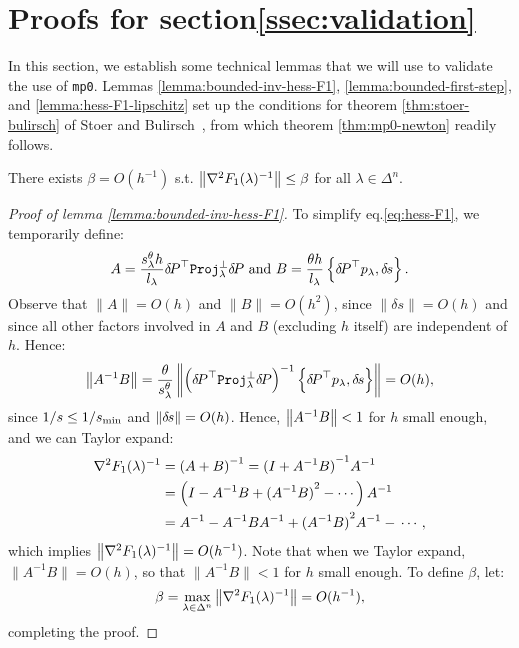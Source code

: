 \documentclass[smallcondensed]{svjour3}
\begin{document}
\section{Proofs for
  section\@ \ref{ssec:validation}}\label{app:validation-proofs} In this section, we establish some technical lemmas that we will use
to validate the use of \texttt{mp0}. Lemmas
\ref{lemma:bounded-inv-hess-F1}, \ref{lemma:bounded-first-step}, and
\ref{lemma:hess-F1-lipschitz} set up the conditions for theorem
\ref{thm:stoer-bulirsch} of Stoer and
Bulirsch~\cite{stoer2013introduction}, from which theorem
\ref{thm:mp0-newton} readily follows.

\begin{lemma}\label{lemma:bounded-inv-hess-F1}
  There exists $\beta = O(h^{-1})$ s.t.
  $\left\|\nabla^2 F_1(\lambda)^{-1}\right\| \leq \beta$ for all
  $\lambda \in \Delta^n$.
\end{lemma}

\begin{proof}[Proof of lemma \ref{lemma:bounded-inv-hess-F1}]
  To simplify eq.\@ \ref{eq:hess-F1}, we temporarily define:
  \begin{equation}
    A = \frac{s^\theta_\lambda h}{l_\lambda} {\delta \hspace{-0.14em} P}^\top \mathtt{Proj}^\perp_\lambda {\delta \hspace{-0.14em} P} \mbox{ and } B = \frac{\theta h}{l_\lambda} \left\{{\delta \hspace{-0.14em} P}^\top p_\lambda, {\delta \hspace{-0.1em} s}\right\}.
  \end{equation}
  Observe that $\|A\| = O(h)$ and $\|B\| = O(h^2)$, since
  $\|\delta s\| = O(h)$ and since all other factors involved in $A$
  and $B$ (excluding $h$ itself) are independent of $h$. Hence:
  \begin{equation}
    \left\|A^{-1} B\right\| = \frac{\theta}{s^\theta_\lambda} \left\|\left({\delta \hspace{-0.14em} P}^\top \mathtt{Proj}^\perp_\lambda {\delta \hspace{-0.14em} P}\right)^{-1} \left\{{\delta \hspace{-0.14em} P}^\top p_\lambda, {\delta \hspace{-0.1em} s}\right\}\right\| = O(h),
  \end{equation}
  since $1/s \leq 1/s_{\operatorname{min}}$ and $\left\|{\delta \hspace{-0.1em} s}\right\| = O(h)$. Hence,
  $\left\|A^{-1} B\right\| < 1$ for $h$ small enough, and we can Taylor
  expand:
  \begin{equation}
    \begin{aligned}
      \nabla^2 F_1(\lambda)^{-1} &= \left(A + B\right)^{-1} = {(I + A^{-1} B)}^{-1} A^{-1} \\
      &= \left(I - A^{-1} B + {(A^{-1} B)}^2 - \cdots\right) A^{-1} \\
      &= A^{-1} - A^{-1} B A^{-1} + {(A^{-1} B)}^2 A^{-1} - \,\cdots,
    \end{aligned}
  \end{equation}
  which implies $\left\|\nabla^2 F_1(\lambda)^{-1}\right\| = O(h^{-1})$. Note
  that when we Taylor expand, $\|A^{-1} B\| = O(h)$, so that
  $\|A^{-1} B\| < 1$ for $h$ small enough. To define $\beta$, let:
  \begin{equation}
    \beta = \max_{\lambda \in \Delta^n} \left\|\nabla^2 F_1(\lambda)^{-1}\right\| = O(h^{-1}),
  \end{equation}
  completing the proof.
\end{proof}
\end{document}
